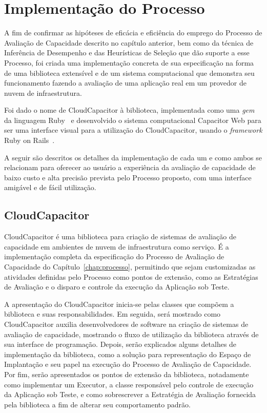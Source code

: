 \chapter{Implementação do Processo}
\label{chap:capacitor}
A fim de confirmar as hipóteses de eficácia e eficiência do emprego do Processo
de Avaliação de Capacidade descrito no capítulo anterior, bem como da técnica de
Inferência de Desempenho e das Heurísticas de Seleção que dão suporte a esse Processo, 
foi criada uma implementação concreta de sua especificação na forma de uma biblioteca
extensível e de um sistema computacional que demonstra seu funcionamento fazendo
a avaliação de uma aplicação real em um provedor de nuvem de infraestrutura.

Foi dado o nome de CloudCapacitor à biblioteca, implementada como uma \emph{gem} da
linguagem Ruby~\cite{ruby} e desenvolvido o sistema computacional Capacitor Web 
para ser uma interface visual para a utilização do CloudCapacitor, usando 
o \emph{framework} Ruby on Rails~\cite{rails}.  

A seguir são descritos os detalhes da implementação de cada um e como ambos se
relacionam para oferecer ao usuário a experiência da avaliação de capacidade
de baixo custo e alta precisão prevista pelo Processo proposto, com uma interface
amigável e de fácil utilização.

\section{CloudCapacitor}
CloudCapacitor é uma biblioteca para criação de sistemas de avaliação de 
capacidade em ambientes de nuvem de infraestrutura como serviço. É a implementação
completa da especificação do Processo de Avaliação de Capacidade do 
Capítulo~\ref{chap:processo}, permitindo que sejam customizadas as atividades 
definidas pelo Processo como pontos de extensão, como as Estratégias de Avaliação
e o disparo e controle da execução da Aplicação sob Teste.

A apresentação do CloudCapacitor inicia-se pelas classes que compõem a biblioteca
e suas responsabilidades. Em seguida, será mostrado como CloudCapacitor auxilia 
desenvolvedores de software na criação de sistemas de avaliação de capacidade,
mostrando o fluxo de utilização da biblioteca através de sua interface de programação.
Depois, serão explicados alguns detalhes de implementação da biblioteca, como 
a solução para representação do Espaço de Implantação e seu papel na execução do
Processo de Avaliação de Capacidade. Por fim, serão apresentados os pontos de extensão
da biblioteca, notadamente como implementar um Executor, a classe responsável pelo
controle de execução da Aplicação sob Teste, e como sobrescrever a Estratégia de
Avaliação fornecida pela biblioteca a fim de alterar seu comportamento padrão.

